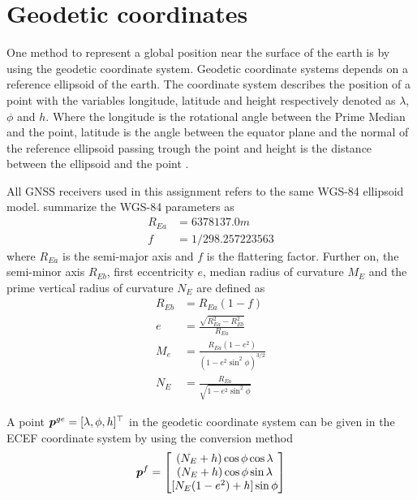 \section{Geodetic coordinates} %
\label{sub:geodetic_coordinates}
One method to represent a global position near the surface of the earth is by using the geodetic coordinate system. Geodetic coordinate systems depends on a reference ellipsoid of the earth. The coordinate system describes the position of a point with the variables longitude, latitude and height respectively denoted as $\lambda$, $\phi$ and $h$. Where the longitude is the rotational angle between the Prime Median and the point, latitude is the angle between the equator plane and the normal of the reference ellipsoid passing trough the point and height is the distance between the ellipsoid and the point \citep{cai2011unmanned}.

All GNSS receivers used in this assignment refers to the same WGS-84 ellipsoid model. \cite{cai2011unmanned} summarize the WGS-84 parameters as
\begin{align}
  R_{Ea}&=6378137.0m\\
  f&=1/298.257223563
\end{align}
where $R_{Ea}$ is the semi-major axis and $f$ is the flattering factor. Further on, the semi-minor axis $R_{Eb}$, first eccentricity $e$, median radius of curvature $M_E$ and the prime vertical radius of curvature $N_E$ are defined as
\begin{align}
  R_{Eb}&=R_{Ea}(1-f)\\
  e&=\frac{\sqrt{R_{Ea}^2-R_{Eb}^2}}{R_{Ea}}\\
  M_e&=\frac{R_{Ea}(1-e^2)}{(1-e^2\sin^2{\phi})^{3/2}}\\
  N_E&=\frac{R_{Ea}}{\sqrt{1-e^2\sin^2{\phi}}}
\end{align}

A point $\boldsymbol{p}^{ge}=[\lambda, \phi, h]^{\top}$ in the geodetic coordinate system can be given in the ECEF coordinate system by using the conversion method
\begin{equation}
  \boldsymbol{p}^f=
  \begin{bmatrix}
    (N_E+h)\cos{\phi}\cos{\lambda}\\
    (N_E+h)\cos{\phi}\sin{\lambda}\\
    [N_E(1-e^2)+h]\sin{\phi}\\
  \end{bmatrix}\label{eq:ge_to_f}
\end{equation}
\citep{cai2011unmanned}


